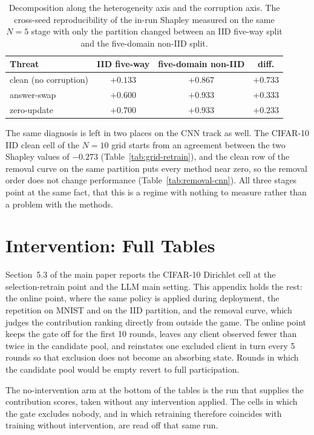 \documentclass[letterpaper]{article} %
\theoremstyle{plain}
\begin{document}
\begin{table}[t]
\centering
\small
\caption{Decomposition along the heterogeneity axis and the corruption axis.
The cross-seed reproducibility of the in-run Shapley measured on the same
$N{=}5$ stage with only the partition changed between an IID five-way split
and the five-domain non-IID split.}
\label{tab:target-decomp}
\begin{tabular}{lccc}
\hline
Threat & IID five-way & five-domain non-IID & diff. \\
\hline
clean (no corruption) & $+0.133$ & $+0.867$ & $+0.733$ \\
answer-swap & $+0.600$ & $+0.933$ & $+0.333$ \\
zero-update & $+0.700$ & $+0.933$ & $+0.233$ \\
\hline
\end{tabular}
\end{table}

The same diagnosis is left in two places on the CNN track as well. The
CIFAR-10 IID clean cell of the $N{=}10$ grid starts from an agreement between
the two Shapley values of $-0.273$ (Table~\ref{tab:grid-retrain}), and the
clean row of the removal curve on the same partition puts every method near
zero, so the removal order does not change performance
(Table~\ref{tab:removal-cnn}). All three stages point at the same fact, that
this is a regime with nothing to measure rather than a problem with the
methods.

\section{Intervention: Full Tables}
\label{app:intervention}

Section~5.3 of the main paper reports the CIFAR-10 Dirichlet cell at the
selection-retrain point and the LLM main setting. This appendix holds the
rest: the online point, where the same policy is applied during deployment,
the repetition on MNIST and on the IID partition, and the removal curve,
which judges the contribution ranking directly from outside the game. The
online point keeps the gate off for the first 10 rounds, leaves any client
observed fewer than twice in the candidate pool, and reinstates one excluded
client in turn every 5 rounds so that exclusion does not become an absorbing
state. Rounds in which the candidate pool would be empty revert to full
participation.

The no-intervention arm at the bottom of the tables is the run that supplies
the contribution scores, taken without any intervention applied. The cells in
which the gate excludes nobody, and in which retraining therefore coincides
with training without intervention, are read off that same run.
\end{document}
